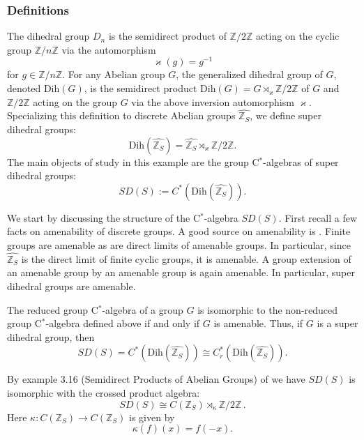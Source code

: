 \documentclass[12pt,reqno]{amsart}
\numberwithin{equation}{section}
\newcommand{\Z}{{\mathbb Z}}
\begin{document}
\subsubsection{Definitions}
The dihedral group $D_n$ is the semidirect product of $\Z/2\Z$ acting on the cyclic group
$\Z/n\Z$ via the automorphism 
\begin{equation*}
\varkappa (g)=g^{-1}
\end{equation*}
for $g\in \Z/n\Z$. 
For any Abelian group $G$, the generalized dihedral group of $G$, denoted Dih$(G)$, is the semidirect product $\mathrm {Dih} (G)=G\rtimes _{\varkappa }\Z/2\Z$ of $G$ and $\Z/2\Z$ acting on the group
$G$ via the above inversion automorphism $\varkappa$. 
Specializing this definition to discrete Abelian groups $\widehat{\Z_S}$, we define super dihedral groups:
\begin{equation*}
\mathrm {Dih} (\widehat{\Z_S})=\widehat{\Z_S}\rtimes _{\varkappa }\Z/2\Z.
\end{equation*}
The main objects of study in this example are the group C$^*$-algebras of super dihedral groups:
\begin{equation*}
SD(S):=C^*(\mathrm {Dih} (\widehat{\Z_S})).
\end{equation*}

We start by discussing the structure of the C$^*$-algebra $SD(S)$. First recall a few facts on amenability of discrete groups. A good source on amenability is \cite{Pat}. 
Finite groups are amenable as are direct limits of amenable groups. In particular, since $\widehat{\Z_S}$ is the direct limit of finite cyclic groups, it is amenable. 
A group extension of an amenable group by an amenable group is again amenable. In particular, super dihedral groups are amenable.

The reduced group C$^*$-algebra of a group $G$ is isomorphic to the non-reduced group C$^*$-algebra defined above if and only if $G$ is amenable. Thus, if $G$ is a super dihedral group, then $$SD(S)=C^*(\mathrm {Dih} (\widehat{\Z_S})) \cong C_r^*(\mathrm {Dih} (\widehat{\Z_S})).$$

By example 3.16 (Semidirect Products of Abelian Groups) of \cite{Williams} we have $SD(S)$ is isomorphic with the crossed product algebra:
\begin{equation*}
SD(S)\cong C(\Z_S)\rtimes_\kappa\Z/2\Z\,.
\end{equation*} 
Here $\kappa: C(\Z_S)\to C(\Z_S)$ is given by
\begin{equation*}
\kappa(f)(x)=f(-x).
\end{equation*}
\end{document}
